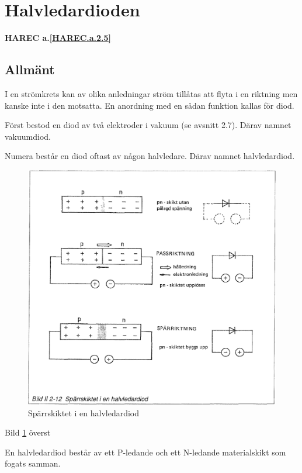 \section{Halvledardioden}
\textbf{HAREC a.\ref{HAREC.a.2.5}\label{myHAREC.a.2.5}}

\subsection{Allmänt}
I en strömkrets kan av olika anledningar ström tillåtas att flyta i en riktning
men kanske inte i den motsatta. En anordning med en sådan funktion kallas för
diod.

Först bestod en diod av två elektroder i vakuum (se avsnitt 2.7). Därav namnet
vakuumdiod. %

Numera består en diod oftast av någon halvledare. Därav namnet halvledardiod.

\begin{figure}[h]
\begin{center}
\includegraphics[width=14cm]{images/bild_2_2-12}
\caption{Spärrskiktet i en halvledardiod}
\label{fig:BildII2-12}
\end{center}
\end{figure}

Bild \ref{fig:BildII2-12} överst

En halvledardiod består av ett P-ledande och ett N-ledande materialskikt som
fogats samman.

